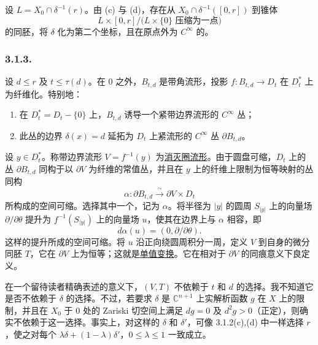设 $L=X_0\cap\delta^{-1}(r)$。由 (c) 与 (d)，存在从 $X_0\cap\delta^{-1}([0,r])$ 到锥体
\[
L\times[0,r]\big/\bigl(L\times\{0\}\text{ 压缩为一点}\bigr)
\]
的同胚，将 $\delta$ 化为第二个坐标，且在原点外为 $C^\infty$ 的。

\subsubsection*{3.1.3.}
设 $d\leq r$ 及 $t\leq\tau(d)$。在 $0$ 之外，$B_{t,d}$ 是带角流形，投影 $f:B_{t,d}\to D_t$ 在 $D_t^*$ 上为纤维化。特别地：

\begin{enumerate}[label=(\alph*)]
\item 在 $D_t^*=D_t-\{0\}$ 上，$B_{t,d}$ 诱导一个紧带边界流形的 $C^\infty$ 丛；
\item 此丛的边界 $\delta(x)=d$ 延拓为 $D_t$ 上紧流形的 $C^\infty$ 丛 $\partial B_{t,d}$。
\end{enumerate}

设 $y\in D_t^*$。称带边界流形 $V=f^{-1}(y)$ 为\underline{消灭圈流形}。由于圆盘可缩，$D_t$ 上的丛 $\partial B_{t,d}$ 同构于以 $\partial V$ 为纤维的常值丛，并且在 $y$ 上的纤维上限制为恒等映射的丛同构
\[
\alpha:\partial B_{t,d}\xrightarrow{\ \sim\ }\partial V\times D_t
\]
所构成的空间可缩。选择其中一个，记为 $\alpha$。将半径为 $|y|$ 的圆周 $S_{|y|}$ 上的向量场 $\partial/\partial\theta$ 提升为 $f^{-1}(S_{|y|})$ 上的向量场 $u$，使其在边界上与 $\alpha$ 相容，即
\[
d\alpha(u)=(0,\partial/\partial\theta).
\]
这样的提升所成的空间可缩。将 $u$ 沿正向绕圆周积分一周，定义 $V$ 到自身的微分同胚 $T$，它在 $\partial V$ 上为恒等；这就是\underline{单值变换}。它在相对于 $\partial V$ 的同痕意义下良定义。

在一个留待读者精确表述的意义下，$(V,T)$ 不依赖于 $t$ 和 $d$ 的选择。我不知道它是否不依赖于 $\delta$ 的选择。不过，若要求 $\delta$ 是 $\mathbb C^{n+1}$ 上实解析函数 $g$ 在 $X$ 上的限制，并且在 $X_0$ 于 $0$ 处的 Zariski 切空间上满足 $dg=0$ 及 $d^2g>0$（正定），则确实不依赖于这一选择。事实上，对这样的 $\delta$ 和 $\delta'$，可像 3.1.2(c),(d) 中一样选择 $r$，使之对每个 $\lambda\delta+(1-\lambda)\delta'$，$0\leq\lambda\leq1$ 一致成立。

